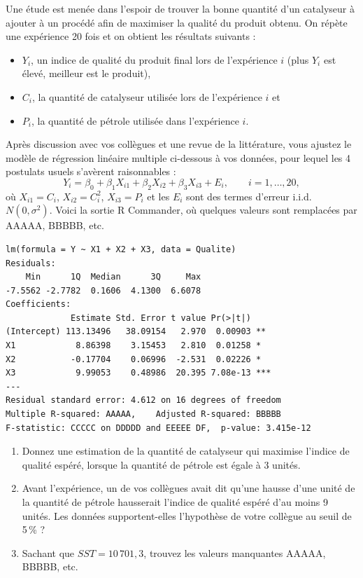 \begin{exercice}
Une étude est menée dans l'espoir de trouver la bonne quantité d'un catalyseur à ajouter à
un procédé afin de maximiser la qualité du produit obtenu. On répète une expérience 20 fois
et on obtient les résultats suivants :
\begin{itemize}
  \item $Y_i$, un indice de qualité du produit final lors de l'expérience $i$ (plus $Y_i$
  est élevé, meilleur est le produit),
  \item $C_i$, la quantité de catalyseur utilisée lors de l'expérience $i$ et
  \item $P_i$, la quantité de pétrole utilisée dans l'expérience $i$.
\end{itemize}
Après discussion avec vos collègues et une revue de la littérature, vous ajustez le modèle
de régression linéaire multiple ci-dessous à vos données, pour lequel les 4 postulats usuels
s'avèrent raisonnables :
\[
  Y_i=\beta_0+\beta_1X_{i1}+\beta_2X_{i2}+\beta_3X_{i3}+E_i,\qquad i=1,\dots,20,
\]
où $X_{i1}=C_i$, $X_{i2}=C_i^2$, $X_{i3}=P_i$ et les $E_i$ sont des termes d'erreur i.i.d.
$N(0,\sigma^2)$. Voici la sortie R Commander, où quelques valeurs sont remplacées par
AAAAA, BBBBB, etc.
\begin{verbatim}
lm(formula = Y ~ X1 + X2 + X3, data = Qualite)
Residuals:
    Min      1Q  Median      3Q     Max
-7.5562 -2.7782  0.1606  4.1300  6.6078
Coefficients:
             Estimate Std. Error t value Pr(>|t|)
(Intercept) 113.13496   38.09154   2.970  0.00903 **
X1            8.86398    3.15453   2.810  0.01258 *
X2           -0.17704    0.06996  -2.531  0.02226 *
X3            9.99053    0.48986  20.395 7.08e-13 ***
---
Residual standard error: 4.612 on 16 degrees of freedom
Multiple R-squared: AAAAA,    Adjusted R-squared: BBBBB
F-statistic: CCCCC on DDDDD and EEEEE DF,  p-value: 3.415e-12
\end{verbatim}
\begin{enumerate}[label=(\alph*)]
  \item Donnez une estimation de la quantité de catalyseur qui maximise l'indice de qualité
  espéré, lorsque la quantité de pétrole est égale à 3 unités.
  \item Avant l'expérience, un de vos collègues avait dit qu'une hausse d'une unité de la
  quantité de pétrole hausserait l'indice de qualité espéré d'au moins 9 unités. Les données
  supportent-elles l'hypothèse de votre collègue au seuil de 5\,\% ?
  \item Sachant que $SST=10\,701,3$, trouvez les valeurs manquantes AAAAA, BBBBB, etc.

\end{enumerate}
\end{exercice}
